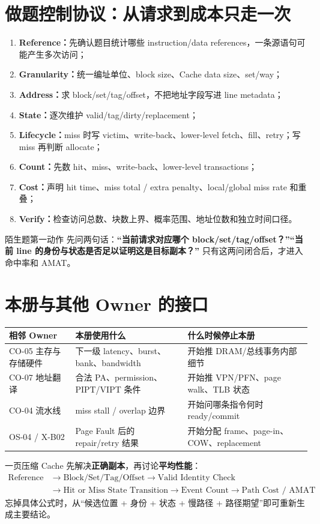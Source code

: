 \documentclass[UTF8,fontset=fandol,11pt,a4paper]{ctexart}
\newcommand{\kw}[1]{\textbf{\color{deep}#1}}\newcommand{\code}[1]{\texttt{#1}}
\begin{document}
\section{做题控制协议：从请求到成本只走一次}
\begin{enumerate}
\item \kw{Reference：}先确认题目统计哪些 instruction/data references，一条源语句可能产生多次访问；
\item \kw{Granularity：}统一编址单位、block size、Cache data size、set/way；
\item \kw{Address：}求 block/set/tag/offset，不把地址字段写进 line metadata；
\item \kw{State：}逐次维护 valid/tag/dirty/replacement；
\item \kw{Lifecycle：}miss 时写 victim、write-back、lower-level fetch、fill、retry；写 miss 再判断 allocate；
\item \kw{Count：}先数 hit、miss、write-back、lower-level transactions；
\item \kw{Cost：}声明 hit time、miss total / extra penalty、local/global miss rate 和重叠；
\item \kw{Verify：}检查访问总数、块数上界、概率范围、地址位数和独立时间口径。
\end{enumerate}

\begin{methodbox}{陌生题第一动作}
先问两句话：\kw{“当前请求对应哪个 block/set/tag/offset？”“当前 line 的身份与状态是否足以证明这是目标副本？”} 只有这两问闭合后，才进入命中率和 AMAT。
\end{methodbox}

\section{本册与其他 Owner 的接口}
\begin{center}\small
\begin{tabularx}{\linewidth}{L{3cm}YY}
\toprule
相邻 Owner & 本册使用什么 & 什么时候停止本册\\\midrule
CO-05 主存与存储硬件 & 下一级 latency、burst、bank、bandwidth & 开始推 DRAM/总线事务内部细节\\
CO-07 地址翻译 & 合法 PA、permission、PIPT/VIPT 条件 & 开始推 VPN/PFN、page walk、TLB 状态\\
CO-04 流水线 & miss stall / overlap 边界 & 开始问哪条指令何时 ready/commit\\
OS-04 / X-B02 & Page Fault 后的 repair/retry 结果 & 开始分配 frame、page-in、COW、replacement\\
\bottomrule
\end{tabularx}
\end{center}

\begin{corebox}{一页压缩}
Cache 先解决\textbf{正确副本}，再讨论\textbf{平均性能}：
\[
\boxed{
\begin{aligned}
\text{Reference}
&\to\text{Block/Set/Tag/Offset}
\to\text{Valid Identity Check}\\
&\to\text{Hit or Miss State Transition}
\to\text{Event Count}
\to\text{Path Cost / AMAT}
\end{aligned}}
\]
忘掉具体公式时，从“候选位置 + 身份 + 状态 + 慢路径 + 路径期望”即可重新生成主要结论。
\end{corebox}
\end{document}
